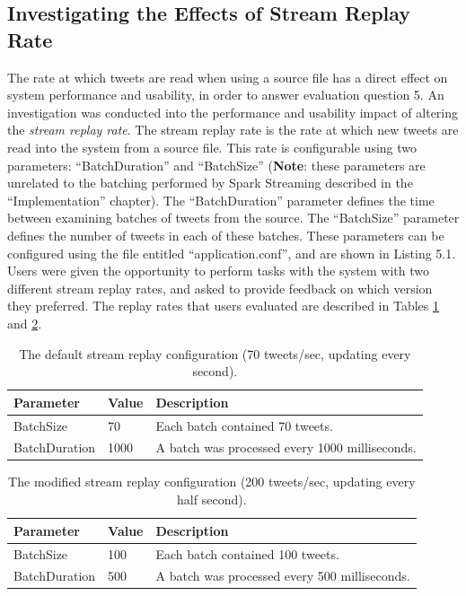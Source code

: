 \documentclass{l4proj}
\begin{document}
    \subsection{Investigating the Effects of Stream Replay Rate}
    The rate at which tweets are read when using a source file has a direct effect on system performance and usability, in order to answer evaluation question 5. An investigation was conducted into the performance and usability impact of altering the \textit{stream replay rate}. The stream replay rate is the rate at which new tweets are read into the system from a source file. This rate is configurable using two parameters: ``BatchDuration'' and ``BatchSize'' (\textbf{Note}: these parameters are unrelated to the batching performed by Spark Streaming described in the ``Implementation'' chapter). The ``BatchDuration'' parameter defines the time between examining batches of tweets from the source. The ``BatchSize'' parameter defines the number of tweets in each of these batches. These parameters can be configured using the file entitled ``application.conf'', and are shown in Listing 5.1. Users were given the opportunity to perform tasks with the system with two different stream replay rates, and asked to provide feedback on which version they preferred. The replay rates that users evaluated are described in Tables \ref{table:replayrate1} and \ref{table:replayrate2}.
    
\begin{table}[H]
    \centering
    \begin{tabular}{| l | l | l |}
    \hline
    Parameter & Value & Description \\ \hline
    BatchSize & 70 & Each batch contained 70 tweets. \\ \hline
    BatchDuration & 1000 & A batch was processed every 1000 milliseconds. \\
    \hline
    \end{tabular}
    \caption{\label{table:replayrate1} The default stream replay configuration (70 tweets/sec, updating every second).}
\end{table}

\begin{table}[H]
    \centering
    \begin{tabular}{| l | l | l |}
    \hline
    Parameter & Value & Description \\ \hline
    BatchSize & 100 & Each batch contained 100 tweets. \\ \hline
    BatchDuration & 500 & A batch was processed every 500 milliseconds. \\
    \hline
    \end{tabular}
    \caption{\label{table:replayrate2} The modified stream replay configuration (200 tweets/sec, updating every half second).}
\end{table}     
    
\end{document}
